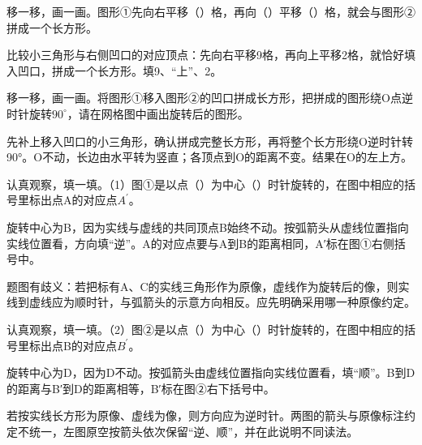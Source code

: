 移一移，画一画。图形①先向右平移（\hspace{1.8em}）格，再向（\hspace{1.8em}）平移（\hspace{1.8em}）格，就会与图形②拼成一个长方形。\par
{}
\begin{BookAnswer}
比较小三角形与右侧凹口的对应顶点：先向右平移9格，再向上平移2格，就恰好填入凹口，拼成一个长方形。填9、“上”、2。
\end{BookAnswer}

移一移，画一画。将图形①移入图形②的凹口拼成长方形，把拼成的图形绕O点逆时针旋转\(90^\circ\)，请在网格图中画出旋转后的图形。\par
{}
\begin{BookAnswer}
先补上移入凹口的小三角形，确认拼成完整长方形，再将整个长方形绕O逆时针转90°。O不动，长边由水平转为竖直；各顶点到O的距离不变。结果在O的左上方。
\end{BookAnswer}

认真观察，填一填。（1）图①是以点（\hspace{1.8em}）为中心（\hspace{1.8em}）时针旋转的，在图中相应的括号里标出点A的对应点\(A^{\prime}\)。\par
{}
\begin{BookAnswer}
旋转中心为B，因为实线与虚线的共同顶点B始终不动。按弧箭头从虚线位置指向实线位置看，方向填“逆”。A的对应点要与A到B的距离相同，A′标在图①右侧括号中。\par 题图有歧义：若把标有A、C的实线三角形作为原像，虚线作为旋转后的像，则实线到虚线应为顺时针，与弧箭头的示意方向相反。应先明确采用哪一种原像约定。
\end{BookAnswer}

认真观察，填一填。（2）图②是以点（\hspace{1.8em}）为中心（\hspace{1.8em}）时针旋转的，在图中相应的括号里标出点B的对应点\(B^{\prime}\)。\par
{}
\begin{BookAnswer}
旋转中心为D，因为D不动。按弧箭头由虚线位置指向实线位置看，填“顺”。B到D的距离与B′到D的距离相等，B′标在图②右下括号中。\par 若按实线长方形为原像、虚线为像，则方向应为逆时针。两图的箭头与原像标注约定不统一，左图原空按箭头依次保留“逆、顺”，并在此说明不同读法。
\end{BookAnswer}

